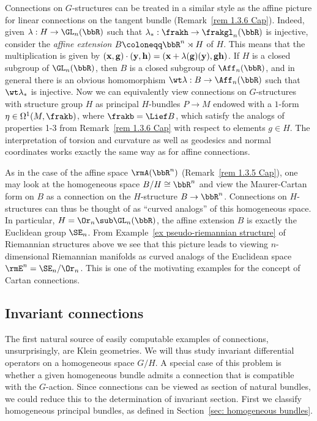 \begin{example}\label{ex 1.3.6 Cap}
    Connections on $G$-structures can be treated in a similar style as the affine picture for linear connections on the tangent bundle (Remark~\ref{rem 1.3.6 Cap}). Indeed, given $\lambda:H\to \GL_n(\bbR)$ such that $\lambda_\ast:\frakh\to \frakgl_n(\bbR)$ is injective, consider the \emph{affine extension} $B\coloneqq \bbR^n\rtimes H$ of $H$. This means that the multiplication is given by $(\bf{x},g)\cdot (\bf{y},h)=(\bf{x}+\lambda(g)(\bf{y}),gh)$. If $H$ is a closed subgroup of $\GL_n(\bbR)$, then $B$ is a closed subgroup of $\Aff_n(\bbR)$, and in general there is an obvious homomorphism $\wt\lambda:B\to \Aff_n(\bbR)$ such that $\wt\lambda_{\ast}$  is injective. Now we can equivalently view connections on $G$-structures with structure group $H$ as principal $H$-bundles $P\to M$ endowed with a $1$-form $\eta\in\Omega^1(M,\frakb)$, where $\frakb=\Lief B$, which satisfy the analogs of properties 1-3 from Remark~\ref{rem 1.3.6 Cap} with respect to elements $g\in H$. The interpretation of torsion and curvature as well as geodesics and normal coordinates works exactly the same way as for affine connections.

    As in the case of the affine space $\rmA(\bbR^n)$ (Remark~\ref{rem 1.3.5 Cap}), one may look at the homogeneous space $B\slash H\cong\bbR^n$ and view the Maurer-Cartan form on $B$ as a connection on the $H$-structure $B\to\bbR^n$.  Connections on $H$-structures can thus be thought of as ``curved analogs'' of this homogeneous space. In particular, $H=\Or_n\sub \GL_n(\bbR)$, the affine extension $B$ is exactly the Euclidean group $\SE_n$. From Example~\ref{ex pseudo-riemannian structure} of Riemannian structures above we see that this picture leads to viewing $n$-dimensional Riemannian manifolds as curved analogs of the Euclidean space $\rmE^n=\SE_n\slash\Or_n$. This is one of the motivating examples for the concept of Cartan connections.
\end{example}







\subsection{Invariant connections}\label{sec: invariant connections}

The first natural source of easily computable examples of connections, unsurprisingly, are Klein geometries. We will thus study invariant differential operators on a homogeneous space $G\slash H$. A special case of this problem is whether a given homogeneous bundle admits a connection that is compatible with the $G$-action. Since connections can be viewed as section of natural bundles, we could reduce this to the determination of invariant section. First we classify homogeneous principal bundles, as defined in Section~\ref{sec: homogeneous bundles}.


